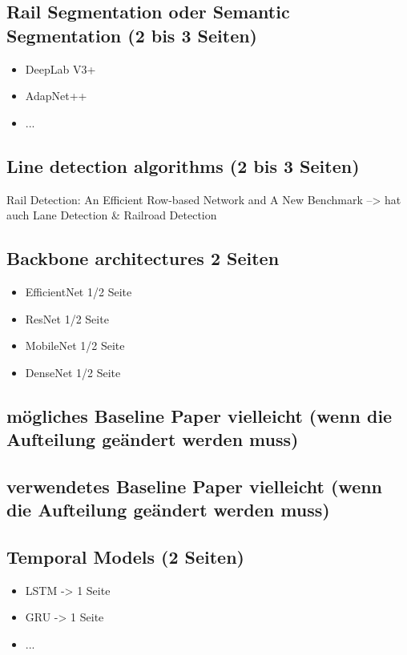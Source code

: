 \subsection{Rail Segmentation oder Semantic Segmentation (2 bis 3 Seiten)}

\begin{itemize}
    \item DeepLab V3+
    \item AdapNet++
    \item ...
\end{itemize}

\subsection{Line detection algorithms (2 bis 3 Seiten)}

Rail Detection: An Efficient Row-based Network and A New Benchmark --> hat auch Lane Detection \& Railroad Detection

\subsection{Backbone architectures 2 Seiten}

\begin{itemize}
    \item EfficientNet 1/2 Seite
    \item ResNet 1/2 Seite
    \item MobileNet 1/2 Seite
    \item DenseNet 1/2 Seite
\end{itemize}

\subsection{mögliches Baseline Paper vielleicht (wenn die Aufteilung geändert werden muss)}

\subsection{verwendetes Baseline Paper vielleicht (wenn die Aufteilung geändert werden muss)}

\subsection{Temporal Models (2 Seiten)}

\begin{itemize}
    \item LSTM -> 1 Seite
    \item GRU -> 1 Seite
    \item ...
\end{itemize}


